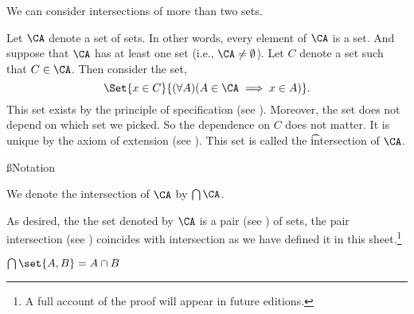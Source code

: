 

We can consider intersections of more than two sets.



Let $\CA$ denote a set of sets.
In other words, every element of $\CA$ is a set.
And suppose that $\CA$ has at least one set (i.e., $\CA \neq \emptyset$).
Let $C$ denote a set such that $C \in \CA$.
Then consider the set,
\[
	\Set{x \in C}{(\forall A)(A \in \CA \implies x \in A)}.
\]
This set exists by the principle of specification (see ).
Moreover, the set does not depend on which set we picked.
So the dependence on $C$ does not matter.
It is unique by the axiom of extension (see ).
This set is called the \t{intersection} of $\CA$.

\ss{Notation}

We denote the intersection of $\CA$ by $\bigcap \CA$.


As desired, the the set denoted by $\CA$ is a pair (see ) of sets, the pair intersection (see ) coincides with intersection as we have defined it in this sheet.\footnote{A full account of the proof will appear in future editions.}

\begin{proposition}
  $\bigcap \set{A, B} = A \cap B$
\end{proposition}

\blankpage
